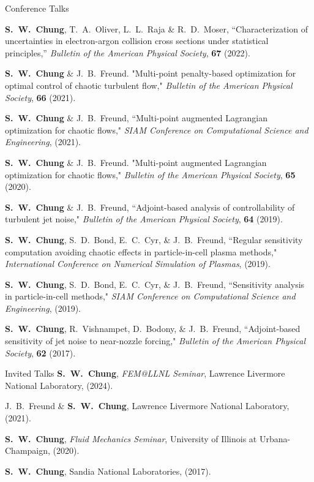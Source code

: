 \documentclass{resume} %
\begin{document}
\begin{rSection}{Conference Talks}
\par
\textbf{S.\ W.\ Chung}, T.\ A.\ Oliver, L.\ L.\ Raja \& R.\ D.\ Moser,  ``Characterization of uncertainties in electron-argon collision cross sections under statistical principles,''
\textit{Bulletin of the American Physical Society}, \textbf{67} (2022).

\par
\textbf{S.\ W.\ Chung} \& J.\ B.\ Freund. "Multi-point penalty-based optimization for optimal control of chaotic turbulent flow,"
\textit{Bulletin of the American Physical Society}, \textbf{66} (2021).

\par
\textbf{S.\ W.\ Chung} \& J.\ B.\ Freund, ``Multi-point augmented Lagrangian optimization for chaotic flows,"
\textit{SIAM Conference on Computational Science and Engineering}, (2021).

\par
\textbf{S.\ W.\ Chung} \& J.\ B.\ Freund. "Multi-point augmented Lagrangian optimization for chaotic flows,"
\textit{Bulletin of the American Physical Society}, \textbf{65} (2020).

\par
\textbf{S.\ W.\ Chung} \& J.\ B.\ Freund,
``Adjoint­-based analysis of controllability of turbulent jet noise,"
\textit{Bulletin of the American Physical Society}, \textbf{64} (2019).

\par
\textbf{S.\ W.\ Chung}, S.\ D.\ Bond, E.\ C.\ Cyr, \& J.\ B.\ Freund,
``Regular sensitivity computation avoiding chaotic effects in particle-in-cell plasma methods,"
\textit{International Conference on Numerical Simulation of Plasmas}, (2019).

\par
\textbf{S.\ W.\ Chung}, S.\ D.\ Bond, E.\ C.\ Cyr, \& J.\ B.\ Freund, ``Sensitivity analysis in particle-in-cell methods,"
\textit{SIAM Conference on Computational Science and Engineering}, (2019).

\par
\textbf{S.\ W.\ Chung}, R.\ Vishnampet, D.\ Bodony, \& J.\ B.\ Freund, ``Adjoint-based sensitivity of jet noise to near-nozzle forcing,"
\textit{Bulletin of the American Physical Society}, \textbf{62} (2017).
\end{rSection}


\begin{rSection}{Invited Talks}
\textbf{S.\ W.\ Chung}, \textit{FEM@LLNL Seminar}, Lawrence Livermore National Laboratory, (2024).
\par
J.\ B.\ Freund \& \textbf{S.\ W.\ Chung}, Lawrence Livermore National Laboratory, (2021).
\par
\textbf{S.\ W.\ Chung}, \textit{Fluid Mechanics Seminar}, University of Illinois at Urbana-Champaign, (2020).
\par
\textbf{S.\ W.\ Chung}, Sandia National Laboratories, (2017).
\end{rSection}
\end{document}
